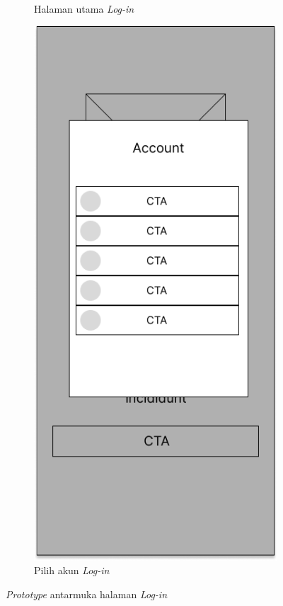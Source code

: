 \begin{figure}[H]
\begin{subfigure}[b]{0.3\textwidth}
	  \caption{Halaman utama \textit{Log-in}}
	  \label{fig:ActivityLogin}
	\end{subfigure}
	\begin{subfigure}[b]{0.3\textwidth}
		\centering
	  \includegraphics[width=\linewidth]{contents/chapter-3/images/MF-login-2.png}
	  \caption{Pilih akun \textit{Log-in}}
	  \label{fig:ActivityLogin2}
	\end{subfigure}
	\caption{\textit{Prototype} antarmuka halaman \textit{Log-in}}
	\label{Fig:FeatureSetLogin}
\end{figure}
